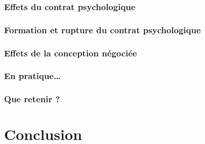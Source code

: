\documentclass[12pt]{article}
\begin{document}
		\subsubsection{Effets du contrat psychologique}
		\subsubsection{Formation et rupture du contrat psychologique}
		\subsubsection{Effets de la conception négociée}
		\subsubsection{En pratique…}
		\subsubsection{Que retenir ?}

\section{Conclusion}



\end{document}
